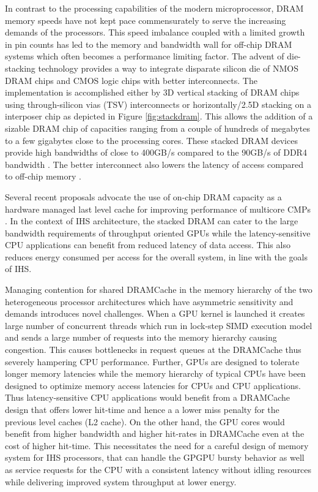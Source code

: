 \par In contrast to the processing capabilities of the modern microprocessor, DRAM memory speeds have not kept pace commensurately to serve the increasing demands of the processors. This speed imbalance coupled with a limited growth in pin counts has led to the memory and bandwidth wall \cite{memory-wall,bandwidth-wall} for off-chip DRAM systems which often becomes a performance limiting factor. The advent of die-stacking technology \cite{3d-stacking} provides a way to integrate disparate silicon die of NMOS DRAM chips and CMOS logic chips with better interconnects. The implementation is accomplished either by 3D vertical stacking of DRAM chips using through-silicon vias (TSV) interconnects or horizontally/2.5D stacking on a interposer chip as depicted in Figure \ref{fig:stackdram}. This allows the addition of a sizable DRAM chip of capacities ranging from a couple of hundreds of megabytes to a few gigabytes close to the processing cores. These stacked DRAM devices provide high bandwidths of close to 400GB/s compared to the 90GB/s of DDR4 bandwidth \cite{xeonphi}. The better interconnect also lowers the latency of access compared to off-chip memory \cite{alloy}. 
\par Several recent proposals advocate the use of on-chip DRAM capacity as a hardware managed last level cache for improving performance of multicore CMPs \cite{alloy,bimodal,loh-hill,atcache}. In the context of IHS architecture, the stacked DRAM can cater to the large bandwidth requirements of throughput oriented GPUs while the latency-sensitive CPU applications can benefit from reduced latency of data access. This also reduces energy consumed per access for the overall system, in line with the goals of IHS.
\par Managing contention for shared DRAMCache in the memory hierarchy of the two heterogeneous processor architectures which have asymmetric sensitivity and demands introduces novel challenges. When a GPU kernel is launched it creates large number of concurrent threads which run in lock-step SIMD execution model and sends a large number of requests into the memory hierarchy causing congestion. This causes bottlenecks in request queues at the DRAMCache thus severely hampering CPU performance. Further, GPUs are designed to tolerate longer memory latencies while the memory hierarchy of typical CPUs have been designed to optimize memory access latencies for CPUs and CPU applications. 
Thus latency-sensitive CPU applications would benefit from a DRAMCache design that offers lower hit-time and hence a a lower miss penalty for the previous level caches (L2 cache). On the other hand, the GPU cores would benefit from higher bandwidth and higher hit-rates in DRAMCache even at the cost of higher hit-time. This necessitates the need for a careful design of memory system for IHS processors, that can handle the GPGPU bursty behavior as well as service requests for the CPU with a consistent latency without idling resources while delivering improved system throughput at lower energy.

